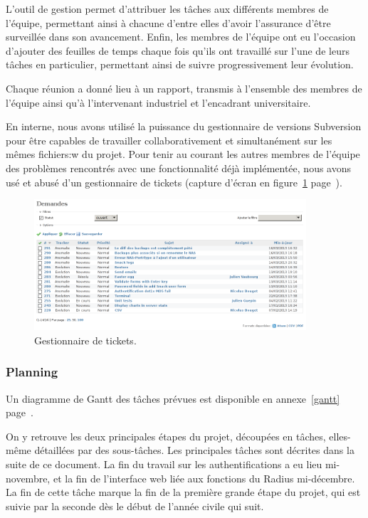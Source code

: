 L'outil de gestion permet d'attribuer les tâches aux différents membres de l'équipe, permettant ainsi à chacune d'entre elles d'avoir l'assurance d'être surveillée dans son avancement. Enfin, les membres de l'équipe ont eu l'occasion d'ajouter des feuilles de temps chaque fois qu'ils ont travaillé sur l'une de leurs tâches en particulier, permettant ainsi de suivre progressivement leur évolution.

Chaque réunion a donné lieu à un rapport, transmis à l'ensemble des membres de l'équipe ainsi qu'à l'intervenant industriel et l'encadrant universitaire.

En interne, nous avons utilisé la puissance du gestionnaire de versions Subversion pour être capables de travailler collaborativement et simultanément sur les mêmes fichiers:w
 du projet. Pour tenir au courant les autres membres de l'équipe des problèmes rencontrés avec une fonctionnalité déjà implémentée, nous avons usé et abusé d'un gestionnaire de tickets (capture d'écran en figure~\ref{tickets} page~\pageref{tickets}).

\begin{figure}[!h]
	\begin{center}
	    \includegraphics[width=0.9\textwidth]{img/tickets.png}
	\end{center}
	\caption{Gestionnaire de tickets.}
	\label{tickets}
\end{figure}

\subsubsection{Planning}

Un diagramme de Gantt des tâches prévues est disponible en annexe~\ref{gantt} page~\pageref{gantt}.

On y retrouve les deux principales étapes du projet, découpées en tâches, elles-même détaillées par des sous-tâches. Les principales tâches sont décrites dans la suite de ce document. La fin du travail sur les authentifications a eu lieu mi-novembre, et la fin de l'interface web liée aux fonctions du Radius mi-décembre. La fin de cette tâche marque la fin de la première grande étape du projet, qui est suivie par la seconde dès le début de l'année civile qui suit.

